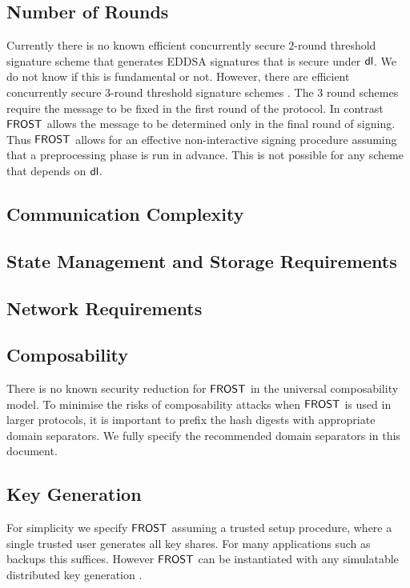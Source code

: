 \subsection{Number of Rounds}\label{section:comparisons:rounds}
Currently there is no known efficient concurrently secure $2$-round threshold signature scheme that generates EDDSA signatures that is secure under $\mathsf{dl}$.
We do not know if this is fundamental or not.  However, there are efficient concurrently secure $3$-round threshold signature schemes \cite{}.
The $3$ round schemes require the message to be fixed in the first round of the protocol.
In contrast $\mathsf{FROST}$ allows the message to be determined only in the final round of signing.
Thus $\mathsf{FROST}$ allows for an effective non-interactive signing procedure assuming that a preprocessing phase is run in advance.
This is not possible for any scheme that depends on $\mathsf{dl}$.

\subsection{Communication Complexity}

\subsection{State Management and Storage Requirements}

\subsection{Network Requirements}

\subsection{Composability}
There is no known security reduction for $\mathsf{FROST}$ in the universal composability model.
To minimise the risks of composability attacks when $\mathsf{FROST}$ is used in larger protocols,
it is important to prefix the hash digests with appropriate domain separators.
We fully specify the recommended domain separators in this document.

\subsection{Key Generation}\label{section:comparisons:keygeneration}
For simplicity we specify $\mathsf{FROST}$ assuming a trusted setup procedure, where a single trusted user generates all key shares.
For many applications such as backups this suffices.
However  $\mathsf{FROST}$ can be instantiated with any simulatable distributed key generation \cite{}.